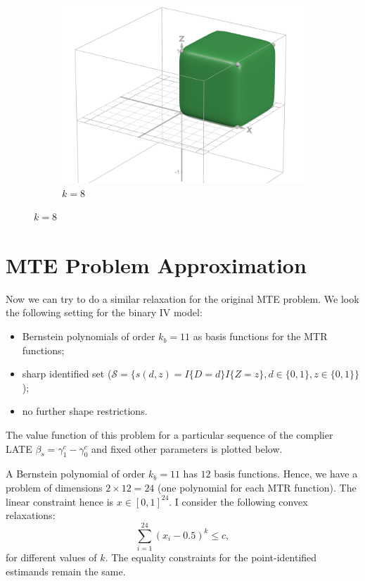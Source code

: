 \documentclass[11pt,a4paper,english]{article} %
\numberwithin{equation}{section}
\numberwithin{figure}{section}
\numberwithin{table}{section}
\theoremstyle{definition}
\theoremstyle{remark}
\begin{document}
\begin{figure}
	\begin{subfigure}{0.5\textwidth}
		\includegraphics[width=\textwidth]{../figures/desmos_dim_3_k_8.png}
		\caption{$k=8$}
	\end{subfigure}
\end{figure}

\section{MTE Problem Approximation}
Now we can try to do a similar relaxation for the original MTE problem.
We look the following setting for the binary IV model:
\begin{itemize}
	\item Bernstein polynomials of order $k_b = 11$ as basis functions for the MTR functions;
	\item sharp identified set ($\mathcal{S} = \{s(d,z) = I\{D=d\}I\{Z=z\}, d \in\{0,1\}, z \in \{0,1\}\}$);
	\item no further shape restrictions.
\end{itemize}
The value function of this problem for a particular sequence of the complier LATE $\beta_s = \gamma_1^c - \gamma_0^c$ and fixed other parameters is plotted below.

A Bernstein polynomial of order $k_b=11$ has $12$ basis functions. Hence, we have a problem of dimensions $2 \times 12 = 24$ (one polynomial for each MTR function).
The linear constraint hence is $x\in[0,1]^{24}$.
I consider the following convex relaxations:
\begin{equation*}
	\sum_{i=1}^{24} (x_i - 0.5)^k \leq c,
\end{equation*}
for different values of $k$.
The equality constraints for the point-identified estimands remain the same.
\end{document}
